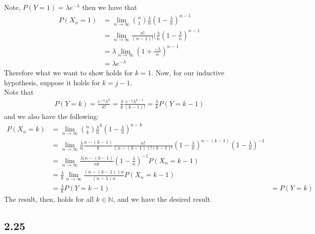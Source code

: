 \documentclass[letterpaper,12pt]{article}
\theoremstyle{definition}
\begin{document}
Note, $P(Y = 1) = \lambda e^{-\lambda}$
then we have that
\begin{align*}
    P(X_n=1)& = \lim_{n \rightarrow \infty} \binom n1 \frac{\lambda}{n} (1-\frac{\lambda}{n})^{n-1} \\
    & = \lim_{n \rightarrow \infty} \frac{n!}{(n-1)!}(\frac{\lambda}{n}(1-\frac{\lambda}{n})^{n-1} \\
    & = \lambda \lim_{n \rightarrow \infty}(1+\frac{-\lambda}{n})^{n-1} \\
    & = \lambda e^{-\lambda}
\end{align*}
Therefore what we want to show holds for $k = 1$. Now, for our inductive hypothesis, suppose it holds for $k = j-1$.\\ Note that
\begin{align*}
    P(Y=k) = \frac{e^{-\lambda}\lambda^k}{k!} = \frac{\lambda}{k} \frac{e^{-\lambda}\lambda^{k-1}}{(k-1)!} = \frac{\lambda}{k} P(Y=k-1)
\end{align*}
and we also have the following:
\begin{align*}
    P(X_n = k) & = \lim_{n \rightarrow \infty} \binom nk \frac{\lambda}{n}^k (1-\frac{\lambda}{n})^{n-k} \\
    & = \lim_{n \rightarrow \infty} \frac{\lambda}{n} \frac{n-(k-1)}{k} \frac{n!}{( n-(k-1))!(k-1)!} (1-\frac{\lambda}{n})^{n-(k-1)} (1-\frac{\lambda}{n})^{-1}\\
    & = \lim_{n \rightarrow \infty} \frac{\lambda(n-(k-1)}{nk}(1-\frac{\lambda}{n})^{-1} P(X_n = k-1)\\
    & = \frac{\lambda}{k} \lim_{n \rightarrow \infty} \frac{(n-(k-1))n}{(n-\lambda)n} P(X_n = k-1) \\
    & = \frac{\lambda}{k} P(Y=k-1)
    & = P(Y=k)
\end{align*}
The result, then, holds for all $k \in \mathbb{N}$, and we have the desired result.

\subsection*{2.25}
\end{document}
